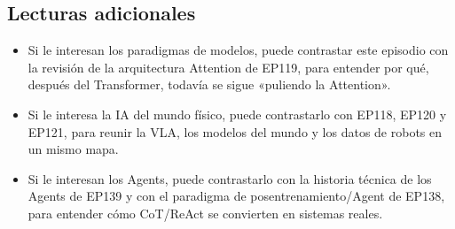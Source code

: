 \subsection{Lecturas adicionales}

\begin{itemize}
\item Si le interesan los paradigmas de modelos, puede contrastar este episodio con la revisión de la arquitectura Attention de EP119, para entender por qué, después del Transformer, todavía se sigue «puliendo la Attention».
\item Si le interesa la IA del mundo físico, puede contrastarlo con EP118, EP120 y EP121, para reunir la VLA, los modelos del mundo y los datos de robots en un mismo mapa.
\item Si le interesan los Agents, puede contrastarlo con la historia técnica de los Agents de EP139 y con el paradigma de posentrenamiento/Agent de EP138, para entender cómo CoT/ReAct se convierten en sistemas reales.
\end{itemize}


